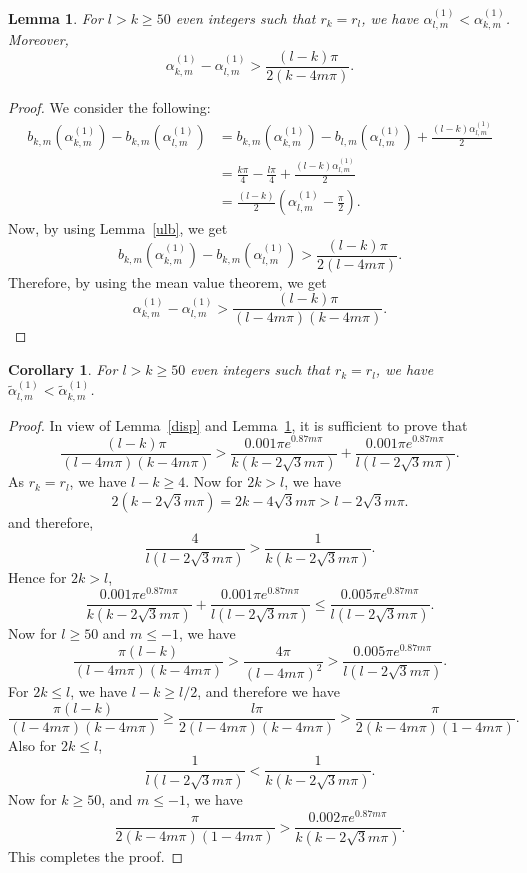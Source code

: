\documentclass[12pt,reqno]{amsart}
\newtheorem{lem}{Lemma}
\newtheorem{cor}{Corollary}
\newcommand{\lemref}[1]{Lemma~\ref{#1}}
\begin{document}
\begin{lem}\label{lequal}
For $l>k\ge50$ even integers such that $r_k=r_l$, we have $\alpha_{l,m}^{(1)}<\alpha_{k,m}^{(1)}$. Moreover,
$$
\alpha_{k,m}^{(1)}-\alpha_{l,m}^{(1)}>\frac{(l-k)\pi}{2(k-4m\pi)}.
$$
\end{lem}
\begin{proof}
We consider the following:
\begin{align*}
b_{k,m}(\alpha_{k,m}^{(1)})-b_{k,m}(\alpha_{l,m}^{(1)})&=b_{k,m}(\alpha_{k,m}^{(1)})-b_{l,m}(\alpha_{l,m}^{(1)})+\frac{(l-k)\alpha_{l,m}^{(1)}}{2}\\
&=\frac{k\pi}{4}-\frac{l\pi}{4}+\frac{(l-k)\alpha_{l,m}^{(1)}}{2}\\
&=\frac{(l-k)}{2}\left(\alpha_{l,m}^{(1)}-\frac{\pi}{2}\right).
\end{align*}
Now, by using \lemref{ulb}, we get
$$
b_{k,m}(\alpha_{k,m}^{(1)})-b_{k,m}(\alpha_{l,m}^{(1)})>\frac{(l-k)\pi}{2(l-4m\pi)}.
$$
Therefore, by using the mean value theorem, we get
$$
\alpha_{k,m}^{(1)}-\alpha_{l,m}^{(1)}>\frac{(l-k)\pi}{(l-4m\pi)(k-4m\pi)}.
$$
\end{proof}

\begin{cor}\label{cequal}
For $l>k\ge 50$ even integers such that $r_k=r_l$, we have $\tilde\alpha_{l,m}^{(1)}<\tilde\alpha_{k,m}^{(1)}$.
\end{cor}
\begin{proof}
In view of \lemref{disp} and \lemref{lequal}, it is sufficient to prove that
$$
\frac{(l-k)\pi}{(l-4m\pi)(k-4m\pi)}>\frac{0.001\pi e^{0.87m\pi}}{k(k-2\sqrt3m\pi)}+\frac{0.001\pi e^{0.87m\pi}}{l(l-2\sqrt3m\pi)}.
$$
As $r_k=r_l$, we have $l-k\ge 4$.
Now for $2k>l$, we have 
$$2(k-2\sqrt3m\pi)=2k-4\sqrt3m\pi>l-2\sqrt3m\pi.$$ and therefore,
$$
\frac{4}{l(l-2\sqrt3m\pi)}>\frac{1}{k(k-2\sqrt3m\pi)}.
$$
Hence for $2k>l$,
$$
\frac{0.001\pi e^{0.87m\pi}}{k(k-2\sqrt3m\pi)}+\frac{0.001\pi e^{0.87m\pi}}{l(l-2\sqrt3m\pi)}\le\frac{0.005\pi e^{0.87m\pi}}{l(l-2\sqrt3m\pi)}.
$$
Now for $l\ge 50$ and $m\le-1$, we have
$$
\frac{\pi(l-k)}{(l-4m\pi)(k-4m\pi)}>\frac{4\pi}{(l-4m\pi)^2}>\frac{0.005\pi e^{0.87m\pi}}{l(l-2\sqrt3m\pi)}.
$$
For $2k\le l$, we have  $l-k\ge{l}/{2}$, and therefore we have
$$
\frac{\pi(l-k)}{(l-4m\pi)(k-4m\pi)}\ge\frac{ l\pi}{2(l-4m\pi)(k-4m\pi)}> \frac{\pi}{2(k-4m\pi)(1-4m\pi)}.
$$
Also for $2k\le l$,
$$
\frac{1}{l(l-2\sqrt3m\pi)}<\frac{1}{k(k-2\sqrt3m\pi)}.
$$
Now for $k\ge 50$, and $m\le-1$, we have
$$
\frac{\pi}{2(k-4m\pi)(1-4m\pi)}>\frac{0.002\pi e^{0.87m\pi}}{k(k-2\sqrt3m\pi)}.
$$
This completes the proof.
\end{proof}
\end{document}
